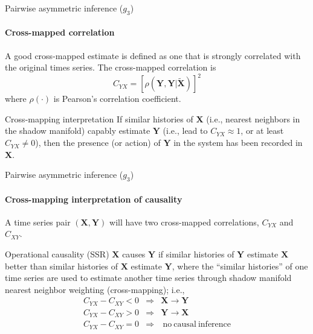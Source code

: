 \documentclass{beamer}
\begin{document}
\begin{frame}{Pairwise asymmetric inference ($g_3$)}
\framesubtitle{Cross-mapped correlation}
A good cross-mapped estimate is defined as one that is strongly correlated with the original times series.  The cross-mapped correlation is
\begin{equation*}
C_{YX} = \left[\rho(\mathbf{Y},\mathbf{Y}|\tilde{\mathbf{X}})\right]^2
\end{equation*}
where $\rho\left(\cdot\right)$ is Pearson's correlation coefficient.
\pause
\begin{block}{Cross-mapping interpretation}
If similar histories of $\mathbf{X}$ (i.e., nearest neighbors in the shadow manifold) capably estimate $\mathbf{Y}$ (i.e., lead to $C_{YX}\approx 1$, or at least $C_{YX}\neq 0$), then the presence (or action) of $\mathbf{Y}$ in the system has been recorded in $\mathbf{X}$.
\end{block}
\end{frame}

\begin{frame}{Pairwise asymmetric inference ($g_3$)}
\framesubtitle{Cross-mapping interpretation of causality}
A time series pair $(\mathbf{X},\mathbf{Y})$ will have two cross-mapped correlations, $C_{YX}$ and $C_{XY}$.
\pause
\begin{block}{Operational causality (SSR)}
$\mathbf{X}$ causes $\mathbf{Y}$ if similar histories of $\mathbf{Y}$ estimate $\mathbf{X}$ better than similar histories of $\mathbf{X}$ estimate $\mathbf{Y}$, where the ``similar histories'' of one time series are used to estimate another time series through shadow manifold nearest neighbor weighting (cross-mapping); i.e.,
\begin{eqnarray*}
C_{YX}-C_{XY}<0&\Rightarrow& \mathbf{X}\rightarrow\mathbf{Y}\\
C_{YX}-C_{XY}>0&\Rightarrow& \mathbf{Y}\rightarrow\mathbf{X}\\
C_{YX}-C_{XY}=0&\Rightarrow& \mathrm{\ no\ causal\ inference}\\
\end{eqnarray*}
\end{block}
\end{frame}
\end{document}
